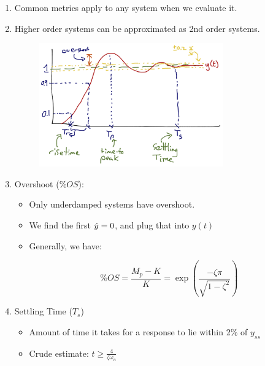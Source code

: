 \begin{enumerate}
\begin{enumerate}
                \begin{enumerate}
                    \item Common metrics apply to any system when we evaluate it.
                    \item Higher order systems can be approximated as 2nd order systems.
                    \begin{figure}[h]
                        \centering
                        \includegraphics[width=0.75\textwidth,height=0.25\textheight,keepaspectratio]{images/timing.png}
                    \end{figure}
                    \item Overshoot ($\% OS$):

                        \begin{itemize}
                            \item Only underdamped systems have overshoot.
                            \item We find the first $\dot{y} = 0$, and plug that into $y(t)$

                            \item Generally, we have:

                                \[
                                     \% OS = \frac{M_p - K}{K} = \exp \left( \frac{-\zeta \pi}{\sqrt{1-\zeta^2}} \right)
                                \]
                        \end{itemize}

                    \item Settling Time ($T_s$)

                        \begin{itemize}
                            \item Amount of time it takes for a response to lie within 2\% of $y_{ss}$
                            \item Crude estimate: $t \ge \frac{4}{\zeta \omega_n}$


\end{itemize}
\end{enumerate}
\end{enumerate}
\end{enumerate}

